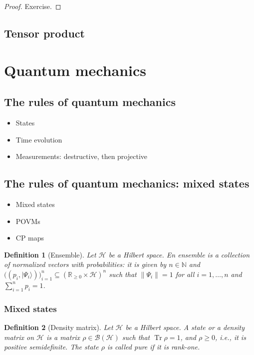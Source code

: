 \documentclass{article}
\newtheorem{definition}{Definition}
\theoremstyle{definition}
\newcommand{\tr}{\operatorname{Tr}}
\newcommand{\ket}[1]{\vert #1 \rangle}
\newcommand{\bounded}[1]{\mathcal{B}(#1)}
\begin{document}
\begin{proof}
  Exercise.
\end{proof}

\subsection{Tensor product}

\section{Quantum mechanics}

\subsection{The rules of quantum mechanics}
 \begin{itemize}
   \item States
   \item Time evolution
   \item Measurements: destructive, then projective
 \end{itemize}
 
\subsection{The rules of quantum mechanics: mixed states}
\begin{itemize}
  \item Mixed states
  \item POVMs
  \item CP maps
\end{itemize}


\begin{definition}[Ensemble]
  Let $\mathcal{H}$ be a Hilbert space. En \emph{ensemble} is a collection of normalized vectors with probabilities: it is given by $n\in\mathbb{N}$ and $\big((p_i, \ket{\Psi_i})\big)_{i=1}^n \subseteq (\mathbb{R}_{\geq 0} \times \mathcal{H})^n$ such that $\|\Psi_i\| = 1$ for all $i=1,\dots,n$ and $\sum_{i=1}^n p_i = 1$.
\end{definition}
\subsubsection{Mixed states}

\begin{definition}[Density matrix]
  Let $\mathcal{H}$ be a Hilbert space. A \emph{state} or a \emph{density matrix} on $\mathcal{H}$ is a matrix $\rho\in\bounded{\mathcal{H}}$ such that $\tr\rho = 1$, and $\rho\geq 0$, i.e., it is positive semidefinite. The state $\rho$ is called \emph{pure} if it is rank-one. 
\end{definition}
\end{document}

